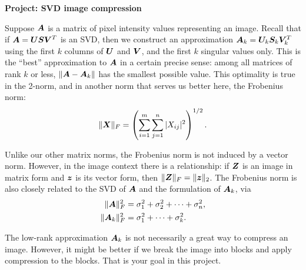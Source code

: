 \documentclass[11pt,twoside]{article}
\begin{document}
\begin{center}
  \bf Project: SVD image compression
\end{center}

Suppose $\bm{A}$ is a matrix of pixel intensity values representing an image. Recall that if $\bm{A}=\bm{U}\bm{S}\bm{V}^T$ is an SVD, then we construct an approximation $\bm{A}_k=\bm{U}_k\bm{S}_k\bm{V}_k^T$ using the first $k$ columns of $\bm{U}$ and $\bm{V}$, and the first $k$ singular values only. This is the ``best'' approximation to $\bm{A}$ in a certain precise sense: among all matrices of rank $k$ or less, $\| \bm{A}-\bm{A}_k \|$ has the smallest possible value. This optimality is true in the 2-norm, and in another norm that serves us better here, the Frobenius norm: \begin{equation}
  \label{eq:fro}
  \| \bm{X} \|_F = \left( \sum_{i=1}^m \sum_{j=1}^n |X_{ij}|^2 \right)^{1/2}.
\end{equation}

Unlike our other matrix norms, the Frobenius norm is not induced by a vector norm. However, in the image context there is a relationship: if $\bm{Z}$ is an image in matrix form and $\bm{z}$ is its vector form, then $\|\bm{Z}\|_F=\|\bm{z}\|_2$. The Frobenius norm is also closely related to the SVD of $\bm{A}$ and the formulation of $\bm{A}_k$, via
\begin{equation}
  \label{eq:frosvd}
  \begin{split}
    \|\bm{A}\|_F^2 &= \sigma_1^2 + \sigma_2^2 + \cdots + \sigma_n^2, \\
    \|\bm{A}_k\|_F^2 &= \sigma_1^2 + \cdots + \sigma_k^2. 
  \end{split}
\end{equation}

The low-rank approximation $\bm{A}_k$ is not necessarily a great way to compress an image. However, it might be better if we break the image into blocks and apply compression to the blocks. That is your goal in this project.
\end{document}
